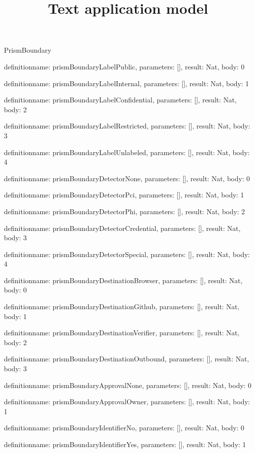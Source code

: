 \begin{lexlean}{PrismBoundary}
\title{Text application model}
\begin{semanticmodule}
definition{name: prismBoundaryLabelPublic, parameters: [], result: Nat, body: 0}

definition{name: prismBoundaryLabelInternal, parameters: [], result: Nat, body: 1}

definition{name: prismBoundaryLabelConfidential, parameters: [], result: Nat, body: 2}

definition{name: prismBoundaryLabelRestricted, parameters: [], result: Nat, body: 3}

definition{name: prismBoundaryLabelUnlabeled, parameters: [], result: Nat, body: 4}

definition{name: prismBoundaryDetectorNone, parameters: [], result: Nat, body: 0}

definition{name: prismBoundaryDetectorPci, parameters: [], result: Nat, body: 1}

definition{name: prismBoundaryDetectorPhi, parameters: [], result: Nat, body: 2}

definition{name: prismBoundaryDetectorCredential, parameters: [], result: Nat, body: 3}

definition{name: prismBoundaryDetectorSpecial, parameters: [], result: Nat, body: 4}

definition{name: prismBoundaryDestinationBrowser, parameters: [], result: Nat, body: 0}

definition{name: prismBoundaryDestinationGithub, parameters: [], result: Nat, body: 1}

definition{name: prismBoundaryDestinationVerifier, parameters: [], result: Nat, body: 2}

definition{name: prismBoundaryDestinationOutbound, parameters: [], result: Nat, body: 3}

definition{name: prismBoundaryApprovalNone, parameters: [], result: Nat, body: 0}

definition{name: prismBoundaryApprovalOwner, parameters: [], result: Nat, body: 1}

definition{name: prismBoundaryIdentifierNo, parameters: [], result: Nat, body: 0}

definition{name: prismBoundaryIdentifierYes, parameters: [], result: Nat, body: 1}


\end{semanticmodule}
\end{lexlean}
